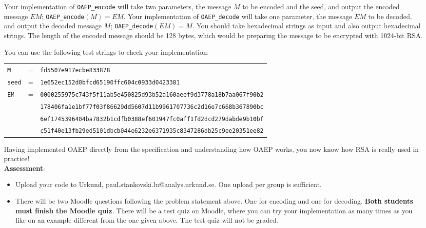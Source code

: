 \documentclass{article}
\begin{document}
\begin{description}
{				Your implementation of \texttt{OAEP\_encode} will take two parameters, the message $M$ to be encoded and the seed, and output the encoded message $EM$; \texttt{OAEP\_encode}$(M)=EM$.
				Your implementation of \texttt{OAEP\_decode} will take one parameter, the message $EM$ to be decoded, and output the decoded message $M$; \texttt{OAEP\_decode}$(EM)=M$. You should take hexadecimal strings as input and also output hexadecimal strings. The length of the encoded message should be 128 bytes, which would be preparing the message to be encrypted with 1024-bit RSA. 
				
				You can use the following test strings to check your implementation:
				\begin{center}
					\begin{tabular}{lcl}
						\texttt{M} & = & \texttt{fd5507e917ecbe833878}\\
						\texttt{seed} & = & \texttt{1e652ec152d0bfcd65190ffc604c0933d0423381}\\
						\texttt{EM} &=& \texttt{0000255975c743f5f11ab5e450825d93b52a160aeef9d3778a18b7aa067f90b2}\\                                 &&\texttt{178406fa1e1bf77f03f86629dd5607d11b9961707736c2d16e7c668b367890bc}\\
						&&\texttt{6ef1745396404ba7832b1cdfb0388ef601947fc0aff1fd2dcd279dabde9b10bf}\\
						&& \texttt{c51f40e13fb29ed5101dbcb044e6232e6371935c8347286db25c9ee20351ee82}\\
					\end{tabular}
				\end{center}
				
				Having implemented OAEP directly from the specification and understanding how OAEP works, you now know how RSA is really used in practice!\\
				\textbf{Assessment}:
				\begin{itemize}
					\item Upload your code to Urkund, paul.stankovski.lu@analys.urkund.se.
					One upload per group is sufficient.
					\item There will be two Moodle questions following the problem statement above. One for encoding and one for decoding. 
					\textbf{Both students must finish the Moodle quiz}.
					There will be a test quiz on Moodle, where you can try your implementation as many times as you like on an example different from the one given above. The test quiz will not be graded.
				\end{itemize}
				
}
\end{description}
\end{document}
